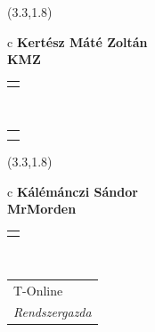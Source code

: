 \documentclass[11pt]{article}
\begin{document}
\makebox(3.3,1.8){
  \renewcommand\arraystretch{1.3}
  \begin{tabular}[c]{c}
    \hspace{8.5mm}
    \LARGE\bf{ Kertész Máté Zoltán }\\
    \hspace{8.5mm}
    \Large{ KMZ }\\
    \renewcommand\arraystretch{3}
    \begin{tabular}[c]{c}
      \centering
      \fontfamily{phv}\selectfont{
        \textbf{
          \textsc{
            \scriptsize{
            \color{Dark}{ Ismerkedő }\color{Bright}{ Webmester }\color{Bright}{ Sminkmester }\color{Bright}{ Programozó }
            }
          }
        }
      }
    \end{tabular}
    \\
    \renewcommand\arraystretch{1}
    \begin{tabular}{p{3.3in}}
      \hspace{.7cm}\\
      \hspace{.7cm}\emph{  }\\
    \end{tabular}
  \end{tabular}
}

\makebox(3.3,1.8){
  \renewcommand\arraystretch{1.3}
  \begin{tabular}[c]{c}
    \hspace{8.5mm}
    \LARGE\bf{ Kálémánczi Sándor }\\
    \hspace{8.5mm}
    \Large{ MrMorden }\\
    \renewcommand\arraystretch{3}
    \begin{tabular}[c]{c}
      \centering
      \fontfamily{phv}\selectfont{
        \textbf{
          \textsc{
            \scriptsize{
            \color{Dark}{ Ismerkedő }\color{Dark}{ Webmester }\color{Bright}{ Sminkmester }\color{Bright}{ Programozó }
            }
          }
        }
      }
    \end{tabular}
    \\
    \renewcommand\arraystretch{1}
    \begin{tabular}{p{3.3in}}
      \hspace{.7cm}T-Online\\
      \hspace{.7cm}\emph{ Rendszergazda }\\
    \end{tabular}
  \end{tabular}
}
\end{document}

